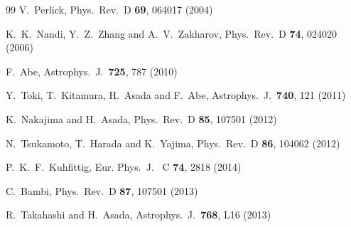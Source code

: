 \documentclass[a4paper,12pt]{article}
\begin{document}
\begin{thebibliography}{99}
  V.~Perlick,
  Phys.\ Rev.\ D {\bf 69}, 064017 (2004)

  K.~K.~Nandi, Y.~Z.~Zhang and A.~V.~Zakharov,
  Phys.\ Rev.\ D {\bf 74}, 024020 (2006)

  F.~Abe,
  Astrophys.\ J.\  {\bf 725}, 787 (2010)

  Y.~Toki, T.~Kitamura, H.~Asada and F.~Abe,
  Astrophys.\ J.\  {\bf 740}, 121 (2011)

  K.~Nakajima and H.~Asada,
  Phys.\ Rev.\ D {\bf 85}, 107501 (2012)

  N.~Tsukamoto, T.~Harada and K.~Yajima,
  Phys.\ Rev.\ D {\bf 86}, 104062 (2012)

  P.~K.~F.~Kuhfittig,
  Eur. Phys.\ J. \ C {\bf 74},  2818 (2014)
 
  C.~Bambi,
  Phys.\ Rev.\ D {\bf 87}, 107501 (2013)

  R.~Takahashi and H.~Asada,
  Astrophys.\ J.\  {\bf 768}, L16 (2013)


\end{thebibliography}
\end{document}
